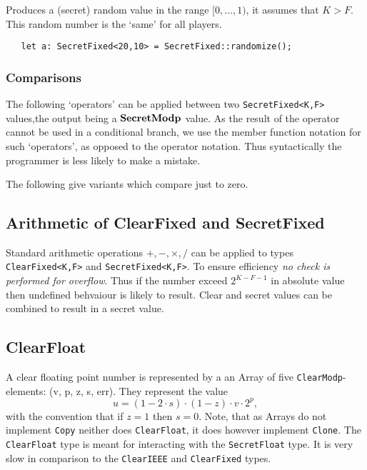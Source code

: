 Produces a (secret) random value in the range $[0,\ldots,1)$, it
assumes that $K > F$.
This random number is the `same' for all players.
\begin{lstlisting}
   let a: SecretFixed<20,10> = SecretFixed::randomize();
\end{lstlisting}

\subsubsection{Comparisons}
The following `operators' can be applied between two \verb|SecretFixed<K,F>|
values,the output being a $\mathbf{SecretModp}$ value.
As the result of the operator cannot be used in a conditional branch,
we use the member function notation for such `operators', as opposed
to the operator notation. Thus syntactically the programmer is less
likely to make a mistake.

\noindent
The following give variants which compare just to zero.


\subsection{Arithmetic of ClearFixed and SecretFixed}
Standard arithmetic operations $+, -, \times, /$ can be applied to
types \verb|ClearFixed<K,F>| and \verb|SecretFixed<K,F>|.
To ensure efficiency {\em no check is performed for overflow}.
Thus if the number exceed $2^{K-F-1}$ in absolute value then 
undefined behvaiour is likely to result.
Clear and secret values can be combined to result in a secret
value.

\subsection{ClearFloat}
A clear floating point number is represented by a an Array of five 
\verb|ClearModp|-elements: (v, p, z, s, err). 
They represent the value
\[ u=(1-2\cdot s) \cdot (1-z) \cdot v \cdot 2^{p}, \]
with the convention that if $z=1$ then $s=0$.
Note, that as Arrays do not implement \verb|Copy| neither does  \verb|ClearFloat|,
it does however implement \verb|Clone|.
The \verb|ClearFloat| type is meant for interacting with the \verb|SecretFloat| type. 
It is very slow in comparison to the \verb|ClearIEEE| and \verb|ClearFixed| types.

